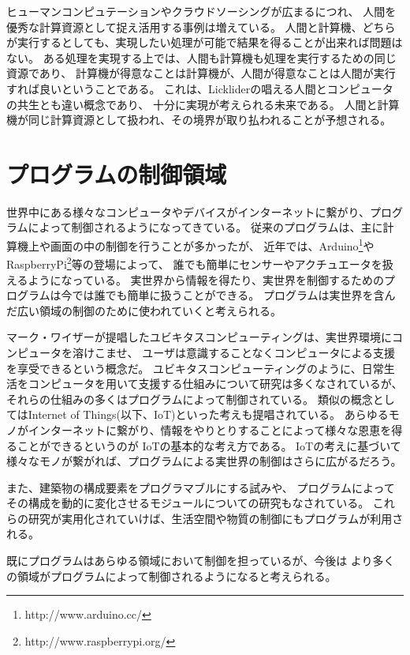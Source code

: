 ヒューマンコンピュテーションやクラウドソーシングが広まるにつれ、
人間を優秀な計算資源として捉え活用する事例は増えている。
人間と計算機、どちらが実行するとしても、実現したい処理が可能で結果を得ることが出来れば問題はない。
ある処理を実現する上では、人間も計算機も処理を実行するための同じ資源であり、
計算機が得意なことは計算機が、人間が得意なことは人間が実行すれば良いということである。
これは、Lickliderの唱える人間とコンピュータの共生\cite{man-computer-symbiosis}とも違い概念であり、
十分に実現が考えられる未来である。
人間と計算機が同じ計算資源として扱われ、その境界が取り払われることが予想される。

\section{プログラムの制御領域}\label{sec:are-of-program}

世界中にある様々なコンピュータやデバイスがインターネットに繋がり、プログラムによって制御されるようになってきている。
従来のプログラムは、主に計算機上や画面の中の制御を行うことが多かったが、
近年では、Arduino\footnote{http://www.arduino.cc/}やRaspberryPi\footnote{http://www.raspberrypi.org/}等の登場によって、
誰でも簡単にセンサーやアクチュエータを扱えるようになっている。
実世界から情報を得たり、実世界を制御するためのプログラムは今では誰でも簡単に扱うことができる。
プログラムは実世界を含んだ広い領域の制御のために使われていくと考えられる。

マーク・ワイザーが提唱したユビキタスコンピューティング\cite{weiser1991computer}は、実世界環境にコンピュータを溶けこませ、
ユーザは意識することなくコンピュータによる支援を享受できるという概念だ。
ユビキタスコンピューティングのように、日常生活をコンピュータを用いて支援する仕組みについて研究は多くなされているが、
それらの仕組みの多くはプログラムによって制御されている。
類似の概念としてはInternet of
Things(以下、IoT)\cite{iot}といった考えも提唱されている。
あらゆるモノがインターネットに繋がり、情報をやりとりすることによって様々な恩恵を得ることができるというのが
IoTの基本的な考え方である。
IoTの考えに基づいて様々なモノが繋がれば、プログラムによる実世界の制御はさらに広がるだろう。

また、建築物の構成要素をプログラマブルにする試み\cite{squama}や、
プログラムによってその構成を動的に変化させるモジュールについての研究もなされている。
これらの研究が実用化されていけば、生活空間や物質の制御にもプログラムが利用される。

既にプログラムはあらゆる領域において制御を担っているが、今後は
より多くの領域がプログラムによって制御されるようになると考えられる。

